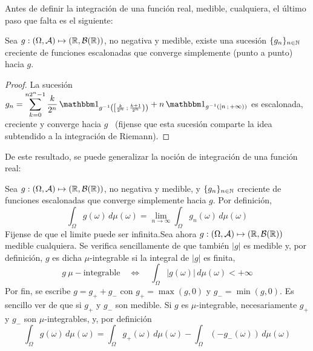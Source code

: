 Antes de definir la integraci\'on de una funci\'on real, medible, cualquiera, el
\'ultimo paso que falta es el siguiente:
%
\begin{teorema}\label{Th:MP:MedibleLimite}
  Sea $g: (\Omega,\mathcal{A}) \mapsto  (\mathbb{R},\mathcal{B}(\mathbb{R}))$, no negativa y medible, existe
  una sucesi\'on  $\{ g_n \}_{n  \in \mathbb{N}}$ creciente de  funciones escalonadas
  que converge simplemente (punto a punto) hacia $g$.
\end{teorema}
%
\begin{proof}
  La  sucesi\'on  $\displaystyle g_n  =  \sum_{k=0}^{n  2^n-1} \frac{k}{2^n}  \,
  \un_{g^{-1}\left(  \left[  \frac{k}{2^n}   \,  ;  \,  \frac{k+1}{2^n}  \right)
    \right)} + n \, \un_{g^{-1}\left( \left[ n \, ; \, +\infty \right) \right)}$
  es escalonada, creciente  y converge hacia $g$ \  (fijense que esta sucesi\'on
  comparte la idea subtendido a la integraci\'on de Riemann).
\end{proof}

De  este resultado, se  puede generalizar  la noci\'on  de integraci\'on  de una
funci\'on real:
%
\begin{definicion}\label{Def:MP:IntegracionReal}
  Sea $g: (\Omega,\mathcal{A})  \mapsto (\mathbb{R},\mathcal{B}(\mathbb{R}))$, no negativa y  medible, y $\{
  g_n  \}_{n  \in  \mathbb{N}}$  creciente  de  funciones  escalonadas  que  converge
  simplemente hacia $g$. Por definici\'on,
  \[
  \int_{\Omega}  g(\omega) \,  d\mu(\omega)  = \lim_{n  \to \infty}  \int_\Omega
  g_n(\omega) \, d\mu(\omega)
  \]
  Fijense de que el limite puede ser infinita.\newline Sea ahora $g: (\Omega,\mathcal{A})
  \mapsto (\mathbb{R},\mathcal{B}(\mathbb{R}))$  medible cualquiera.  Se  verifica sencillamente de
  que  tambi\'en   $|g|$  es   medible  y,  por   definici\'on,  $g$   es  dicha
  $\mu$-integrable si la integral de $|g|$ es finita,
  \[
  g\: \mu-\mbox{integrable} \quad  \Leftrightarrow \quad \int_\Omega |g(\omega)|
  \, d\mu(\omega) < +\infty
  \]
  Por  fin,  se escribe  $g  =  g_+  + g_-$  con  $g_+  =  \max(g,0)$ y  $g_-  =
  \min(g,0)$. Es  sencillo ver de que  si $g_+$ y  $g_-$ son medible. Si  $g$ es
  $\mu$-integrable, necesariamente  $g_+$ y $g_-$ son  $\mu$-integrables, y, por
  definici\'on
  \[
  \int_\Omega   g(\omega)   \,  d\mu(\omega)   =   \int_\Omega  g_+(\omega)   \,
  d\mu(\omega) - \int_\Omega \left( - g_-(\omega) \right) \, d\mu(\omega)
  \]
\end{definicion}

